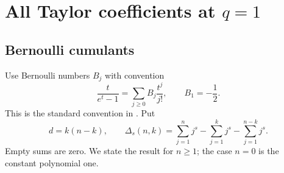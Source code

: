 \documentclass[11pt,a4paper]{article}
\numberwithin{equation}{section}
\theoremstyle{definition}
\theoremstyle{remark}
\begin{document}
\section{All Taylor coefficients at \texorpdfstring{$q=1$}{q = 1}}
\label{sec:nearone}

\subsection{Bernoulli cumulants}
Use Bernoulli numbers $B_j$ with convention
\begin{equation}
 \frac{t}{e^t-1}=\sum_{j\ge0}B_j\frac{t^j}{j!},
 \qquad B_1=-\frac12.
 \label{eq:bernoulli-convention}
\end{equation}
This is the standard convention in \cite[\S24.2]{dlmfbernoulli}. Put
\begin{equation}
 d=k(n-k),\qquad
 \Delta_s(n,k)=\sum_{j=1}^n j^s-\sum_{j=1}^k j^s
                             -\sum_{j=1}^{n-k}j^s.
 \label{eq:delta-power}
\end{equation}
Empty sums are zero. We state the result for $n\ge1$; the case $n=0$
is the constant polynomial one.
\end{document}
